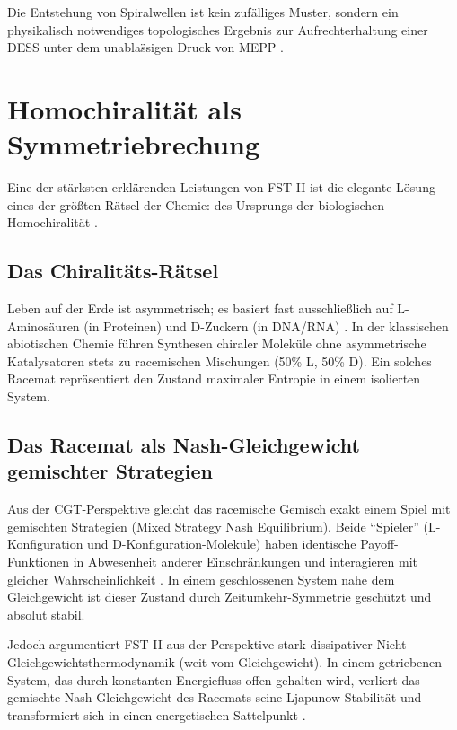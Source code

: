 \documentclass[12pt,a4paper]{article}
\theoremstyle{remark}
\begin{document}
Die Entstehung von Spiralwellen ist kein zuf\"alliges Muster, sondern ein physikalisch notwendiges topologisches Ergebnis zur Aufrechterhaltung einer DESS unter dem unabla\"ssigen Druck von MEPP \citep{HypercycleInfinite}.

\section{Homochiralit\"at als Symmetriebrechung}
\label{sec:chirality}

Eine der st\"arksten erkl\"arenden Leistungen von FST-II ist die elegante L\"osung eines der gr\"o\ss{}ten R\"atsel der Chemie: des Ursprungs der biologischen Homochiralit\"at \citep{Biochirality}.

\subsection{Das Chiralit\"ats-R\"atsel}

Leben auf der Erde ist asymmetrisch; es basiert fast ausschlie\ss{}lich auf L-Aminos\"auren (in Proteinen) und D-Zuckern (in DNA/RNA) \citep{HomochiralityThermo}. In der klassischen abiotischen Chemie f\"uhren Synthesen chiraler Molek\"ule ohne asymmetrische Katalysatoren stets zu racemischen Mischungen (50\% L, 50\% D). Ein solches Racemat repr\"asentiert den Zustand maximaler Entropie in einem isolierten System.

\subsection{Das Racemat als Nash-Gleichgewicht gemischter Strategien}

Aus der CGT-Perspektive gleicht das racemische Gemisch exakt einem Spiel mit gemischten Strategien (Mixed Strategy Nash Equilibrium). Beide ``Spieler'' (L-Konfiguration und D-Konfiguration-Molek\"ule) haben identische Payoff-Funktionen in Abwesenheit anderer Einschr\"ankungen und interagieren mit gleicher Wahrscheinlichkeit \citep{TimeReversalSymmetry}. In einem geschlossenen System nahe dem Gleichgewicht ist dieser Zustand durch Zeitumkehr-Symmetrie gesch\"utzt und absolut stabil.

Jedoch argumentiert FST-II aus der Perspektive stark dissipativer Nicht-Gleichgewichtsthermodynamik (weit vom Gleichgewicht). In einem getriebenen System, das durch konstanten Energiefluss offen gehalten wird, verliert das gemischte Nash-Gleichgewicht des Racemats seine Ljapunow-Stabilit\"at und transformiert sich in einen energetischen Sattelpunkt \citep{TimeReversalSymmetry}.
\end{document}
